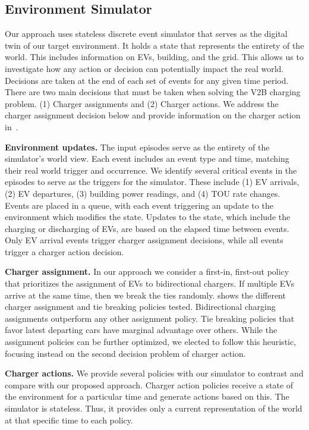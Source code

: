 \subsection{Environment Simulator}
Our approach uses stateless discrete event simulator that serves as the digital twin of our target environment. It holds a state that represents the entirety of the world. This includes information on EVs, building, and the grid. This allows us to investigate how any action or decision can potentially impact the real world. Decisions are taken at the end of each set of events for any given time period. There are two main decisions that must be taken when solving the V2B charging problem. (1) Charger assignments and (2) Charger actions. We address the charger assignment decision below and provide information on the charger action in~.

\textbf{Environment updates.} The input episodes serve as the entirety of the simulator's world view. Each event includes an event type and time, matching their real world trigger and occurrence. We identify several critical events in the episodes to serve as the triggers for the simulator. These include (1) EV arrivals, (2) EV departures, (3) building power readings, and (4) TOU rate changes. Events are placed in a queue, with each event triggering an update to the environment which modifies the state. Updates to the state, which include the charging or discharging of EVs, are based on the elapsed time between events. Only EV arrival events trigger charger assignment decisions, while all events trigger a charger action decision.


\textbf{Charger assignment.} In our approach we consider a first-in, first-out policy that prioritizes the assignment of EVs to bidirectional chargers. If multiple EVs arrive at the same time, then we break the ties randomly.  shows the different charger assignment and tie breaking policies tested. Bidirectional charging assignments outperform any other assignment policy. Tie breaking policies that favor latest departing cars have marginal advantage over others. While the assignment policies can be further optimized, we elected to follow this heuristic, focusing instead on the second decision problem of charger action.

\textbf{Charger actions.} We provide several policies with our simulator to contrast and compare with our proposed approach. Charger action policies receive a state of the environment for a particular time and generate actions based on this. The simulator is stateless. Thus, it provides only a current representation of the world at that specific time to each policy.



